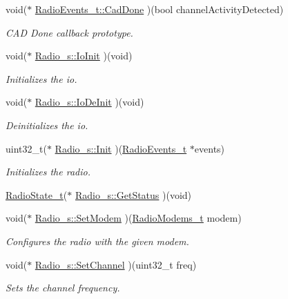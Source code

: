 \begin{DoxyCompactItemize}
void($\ast$ \hyperlink{group__LORA_gacf79a39fe3d615bed87b1414e73df6b2}{Radio\+Events\+\_\+t\+::\+Cad\+Done} )(bool channel\+Activity\+Detected)
\begin{DoxyCompactList}\small\item\em C\+AD Done callback prototype. \end{DoxyCompactList}\item 
void($\ast$ \hyperlink{group__LORA_ga5a84db3f810c3c6470a330034981fc7b}{Radio\+\_\+s\+::\+Io\+Init} )(void)
\begin{DoxyCompactList}\small\item\em Initializes the io. \end{DoxyCompactList}\item 
void($\ast$ \hyperlink{group__LORA_ga45d0a08fcddbc5d8364ce980c26028ac}{Radio\+\_\+s\+::\+Io\+De\+Init} )(void)
\begin{DoxyCompactList}\small\item\em Deinitializes the io. \end{DoxyCompactList}\item 
uint32\+\_\+t($\ast$ \hyperlink{group__LORA_gafb896d98cceb49c55af00f5d5aa964cd}{Radio\+\_\+s\+::\+Init} )(\hyperlink{structRadioEvents__t}{Radio\+Events\+\_\+t} $\ast$events)
\begin{DoxyCompactList}\small\item\em Initializes the radio. \end{DoxyCompactList}\item 
\hyperlink{group__LORA_ga2f3fa4ad0237c4ace94aa99086aac9f5}{Radio\+State\+\_\+t}($\ast$ \hyperlink{group__LORA_ga24c01d8388f399e8ccaea190048eea9d}{Radio\+\_\+s\+::\+Get\+Status} )(void)
\item 
void($\ast$ \hyperlink{group__LORA_ga92515d5b16f5093727b90256a8929b82}{Radio\+\_\+s\+::\+Set\+Modem} )(\hyperlink{group__LORA_ga992ef7a5b7f52975ba7bd8dd97740057}{Radio\+Modems\+\_\+t} modem)
\begin{DoxyCompactList}\small\item\em Configures the radio with the given modem. \end{DoxyCompactList}\item 
void($\ast$ \hyperlink{group__LORA_gaf41c78922a5831b2e0ceb458286846fd}{Radio\+\_\+s\+::\+Set\+Channel} )(uint32\+\_\+t freq)
\begin{DoxyCompactList}\small\item\em Sets the channel frequency. \end{DoxyCompactList}\item 

\end{DoxyCompactItemize}

